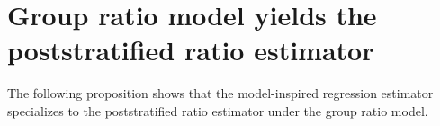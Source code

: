 

\section{Group ratio model yields the poststratified ratio estimator}
\setcounter{theorem}{0}
\setcounter{equation}{0}


\renewcommand{\theenumi}{\roman{enumi}}
\renewcommand{\labelenumi}{\textnormal{(\theenumi)}$\;\;$}


The following proposition shows that the model-inspired regression estimator specializes to
the poststratified ratio estimator under the group ratio model.
